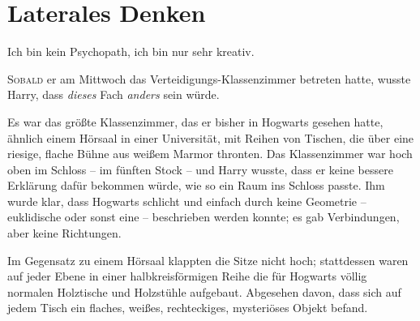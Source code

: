 \chapter{Laterales Denken}

\begin{chapterOpeningQuote}
Ich bin kein Psychopath, ich bin nur sehr kreativ.
\end{chapterOpeningQuote}

\lettrine{S}{obald} er am Mittwoch das Verteidigungs-Klassenzimmer betreten hatte, wusste Harry, dass \emph{dieses} Fach \emph{anders} sein würde.

Es war das größte Klassenzimmer, das er bisher in Hogwarts gesehen hatte, ähnlich einem Hörsaal in einer Universität, mit Reihen von Tischen, die über eine riesige, flache Bühne aus weißem Marmor thronten. Das Klassenzimmer war hoch oben im Schloss – im fünften Stock – und Harry wusste, dass er keine bessere Erklärung dafür bekommen würde, wie so ein Raum ins Schloss passte. Ihm wurde klar, dass Hogwarts schlicht und einfach durch keine Geometrie – euklidische oder sonst eine – beschrieben werden konnte; es gab Verbindungen, aber keine Richtungen.

Im Gegensatz zu einem Hörsaal klappten die Sitze nicht hoch; stattdessen waren auf jeder Ebene in einer halbkreisförmigen Reihe die für Hogwarts völlig normalen Holztische und Holzstühle aufgebaut. Abgesehen davon, dass sich auf jedem Tisch ein flaches, weißes, rechteckiges, mysteriöses Objekt befand.

